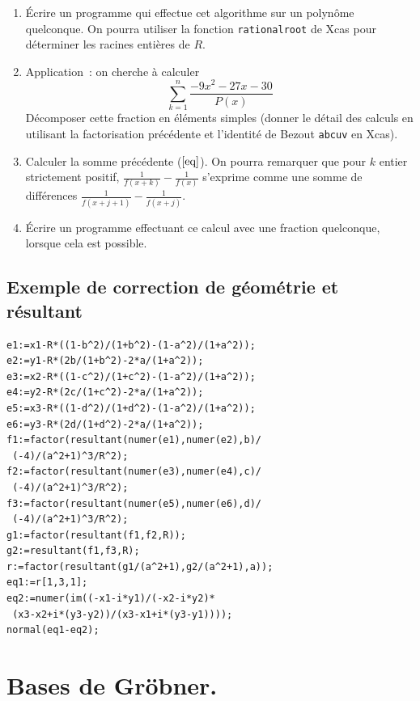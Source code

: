 \documentclass[a4paper,11pt]{article}
\begin{document}
\begin{giacjshere}
\begin{enumerate}
\[P(x)=x^6+9x^5+29x^4+41x^3+37 x^2+59x+31\]
Montrer que $P$ a la propriété $\mathcal{I}$. Calculer
la ou les racines entières de $R$ et donner la factorisation
correspondante de $P$. 
\item \'Ecrire un programme qui effectue cet algorithme sur un
polyn\^ome quelconque. On pourra utiliser la fonction 
\verb|rationalroot| de Xcas pour d\'eterminer les racines
enti\`eres de $R$.
\item Application~: on cherche \`a calculer
\begin{equation} \label{eq}
 \sum_{k=1}^n \frac{-9x^2-27x-30}{P(x)}
\end{equation}
D\'ecomposer cette fraction
en \'el\'ements simples (donner le d\'etail des calculs en utilisant
la factorisation pr\'ec\'edente et l'identit\'e de Bezout 
\verb|abcuv| en Xcas). 
\item Calculer la somme pr\'ec\'edente (\(\ref{eq}\)).
On pourra remarquer que pour $k$ entier strictement positif,
$\frac{1}{f(x+k)}-\frac{1}{f(x)}$
s'exprime comme une somme de diff\'erences  
$\frac{1}{f(x+j+1)}-\frac{1}{f(x+j)}$.
\item \'Ecrire un programme effectuant ce calcul avec une fraction
quelconque, lorsque cela est possible.
\end{enumerate}

\pagebreak

\subsection{Exemple de correction de g\'eom\'etrie et r\'esultant}
\begin{verbatim}
e1:=x1-R*((1-b^2)/(1+b^2)-(1-a^2)/(1+a^2));
e2:=y1-R*(2b/(1+b^2)-2*a/(1+a^2));
e3:=x2-R*((1-c^2)/(1+c^2)-(1-a^2)/(1+a^2));
e4:=y2-R*(2c/(1+c^2)-2*a/(1+a^2));
e5:=x3-R*((1-d^2)/(1+d^2)-(1-a^2)/(1+a^2));
e6:=y3-R*(2d/(1+d^2)-2*a/(1+a^2));
f1:=factor(resultant(numer(e1),numer(e2),b)/
 (-4)/(a^2+1)^3/R^2);
f2:=factor(resultant(numer(e3),numer(e4),c)/
 (-4)/(a^2+1)^3/R^2);
f3:=factor(resultant(numer(e5),numer(e6),d)/
 (-4)/(a^2+1)^3/R^2);
g1:=factor(resultant(f1,f2,R));
g2:=resultant(f1,f3,R);
r:=factor(resultant(g1/(a^2+1),g2/(a^2+1),a));
eq1:=r[1,3,1];
eq2:=numer(im((-x1-i*y1)/(-x2-i*y2)*
 (x3-x2+i*(y3-y2))/(x3-x1+i*(y3-y1))));
normal(eq1-eq2);
\end{verbatim}

\section{Bases de Gr\"obner.} \label{sec:groebner}  

\end{giacjshere}
\end{document}
